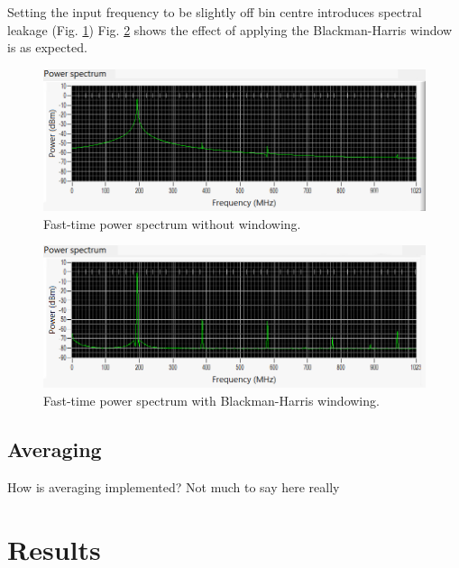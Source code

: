 \documentclass{article}
\begin{document}
Setting the input frequency to be slightly off bin centre introduces spectral leakage (Fig. \ref{fig:WindowNone}) Fig. \ref{fig:WindowBMH} shows the effect of applying the Blackman-Harris window is as expected.

\begin{figure}
	\centering
	\includegraphics[width=\textwidth]{window-none}
	\caption{Fast-time power spectrum without windowing.}
	\label{fig:WindowNone}
\end{figure}

\begin{figure}
	\centering
	\includegraphics[width=\textwidth]{window-bmh}
	\caption{Fast-time power spectrum with Blackman-Harris windowing.}
	\label{fig:WindowBMH}
\end{figure}

\subsection{Averaging}
How is averaging implemented? Not much to say here really

\section{Results}
\end{document}
